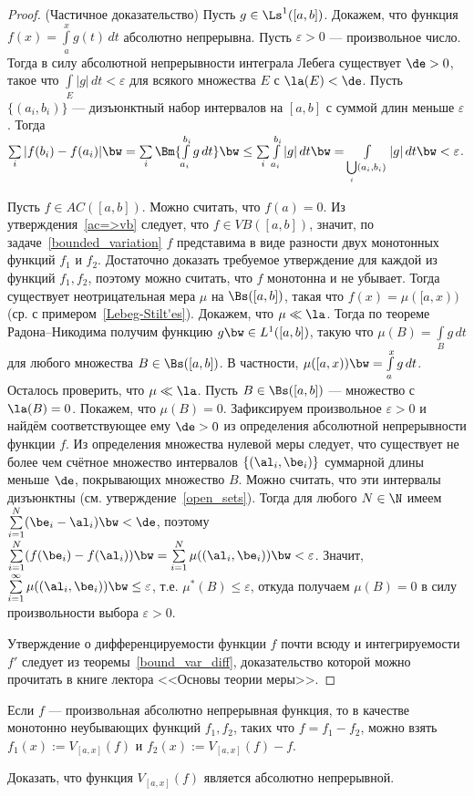 \documentclass[10pt]{article}
\newcommand{\ve}{\varepsilon}
\begin{document}
\begin{proof}(Частичное доказательство)
Пусть $g\in \Ls^1([a,b])$. Докажем, что функция
$f(x)=\int\limits_a^xg(t)\,dt$ абсолютно непрерывна. Пусть $\ve>0$
--- произвольное число. Тогда в силу абсолютной непрерывности
интеграла Лебега существует $\de>0$, такое что
$\int\limits_E|g|\,dt<\ve$ для всякого множества $E$ с $\la(E)<\de$.
Пусть $\{(a_i,b_i)\}$ --- дизъюнктный набор интервалов на $[a,b]$ с
суммой длин меньше $\ve$. Тогда $\sum\limits_i|f(b_i)-f(a_i)|\bw
=\sum\limits_i\Bm{\int\limits_{a_i}^{b_i}g\,dt}\bw
\le\sum\limits_i\int\limits_{a_i}^{b_i}|g|\,dt\bw
=\int\limits_{\bigcup\limits_i(a_i,b_i)}|g|\,dt\bw <\ve$.

Пусть $f\in AC([a,b])$. Можно считать, что $f(a)=0$. Из
утверждения~\ref{ac=>vb} следует, что $f\in VB([a,b])$, значит, по
задаче~\ref{bounded_variation} $f$ представима в виде разности двух
монотонных функций $f_1$ и $f_2$. Достаточно доказать требуемое
утверждение для каждой из функций $f_1,f_2$, поэтому можно считать,
что $f$ монотонна и не убывает. Тогда существует неотрицательная
мера $\mu$ на $\Bs([a,b])$, такая что $f(x)=\mu([a,x))$ (ср. с
примером~\ref{Lebeg-Stilt'es}). Докажем, что $\mu\ll\la$. Тогда по
теореме Радона--Никодима получим функцию $g\bw \in L^1([a,b])$,
такую что $\mu(B)=\int\limits_Bg\,dt$ для любого множества
$B\in\Bs([a,b])$. В частности, $\mu([a,x))\bw
=\int\limits_a^xg\,dt$. Осталось проверить, что $\mu\ll\la$. Пусть
$B\in\Bs([a,b])$ --- множество с $\la(B)=0$. Покажем, что
$\mu(B)=0$. Зафиксируем произвольное $\ve>0$ и найдём
соответствующее ему $\de>0$ из определения абсолютной непрерывности
функции $f$. Из определения множества нулевой меры следует, что
существует не более чем счётное множество интервалов
$\{(\al_i,\be_i)\}$ суммарной длины меньше $\de$, покрывающих
множество $B$. Можно считать, что эти интервалы дизъюнктны (см.
утверждение~\ref{open_sets}). Тогда для любого $N\in\N$ имеем
$\sum\limits_{i=1}^N(\be_i-\al_i)\bw <\de$, поэтому
$\sum\limits_{i=1}^N(f(\be_i)-f(\al_i))\bw
=\sum\limits_{i=1}^N\mu((\al_i,\be_i))\bw <\ve$. Значит,
$\sum\limits_{i=1}^\infty\mu((\al_i,\be_i))\bw \le\ve$, т.е.
$\mu^*(B)\le\ve$, откуда получаем $\mu(B)=0$ в силу произвольности
выбора $\ve>0$.

Утверждение о дифференцируемости функции $f$ почти всюду и
интегрируемости $f'$ следует из теоремы~\ref{bound_var_diff},
доказательство которой можно прочитать в книге лектора <<Основы
теории меры>>.
\end{proof}

\begin{note}
Если $f$ --- произвольная абсолютно непрерывная функция, то в
качестве монотонно неубывающих функций $f_1,f_2$, таких что
$f=f_1-f_2$, можно взять $f_1(x):=V_{[a,x]}(f)$ и
$f_2(x):=V_{[a,x]}(f)-f$.
\end{note}
\begin{problem}
Доказать, что функция $V_{[a,x]}(f)$ является абсолютно непрерывной.
\end{problem}
\end{document}

